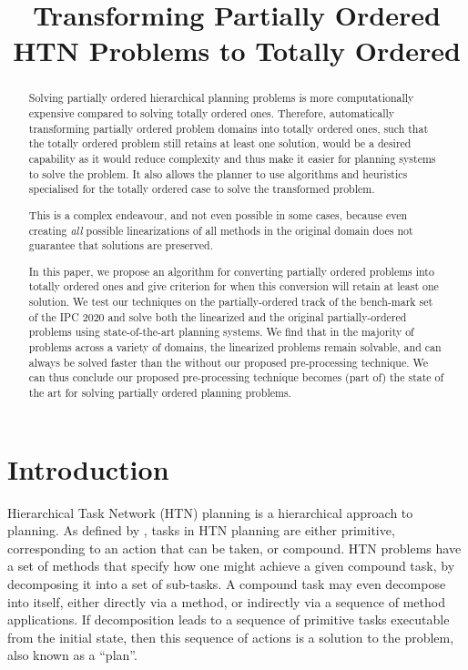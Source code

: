 \documentclass[letterpaper]{article}
\title{Transforming Partially Ordered HTN Problems to Totally Ordered}
\begin{document}
\maketitle

\begin{abstract}
Solving partially ordered hierarchical planning problems is more computationally expensive compared to solving totally ordered ones. Therefore, automatically transforming partially ordered problem domains into totally ordered ones, such that the totally ordered problem still retains at least one solution, would be a desired capability as it would reduce complexity and thus make it easier for planning systems to solve the problem. It also allows the planner to use algorithms and heuristics specialised for the totally ordered case to solve the transformed problem. 

This is a complex endeavour, and not even possible in some cases, because even creating \emph{all} possible linearizations of all methods in the original domain does not guarantee that solutions are preserved. 

In this paper, we propose an algorithm for converting partially ordered problems into totally ordered ones and give criterion for when this conversion will retain at least one solution. We test our techniques on the partially-ordered track of the bench-mark set of the IPC 2020 and solve both the linearized and the original partially-ordered problems using state-of-the-art planning systems. We find that in the majority of problems across a variety of domains, the linearized problems remain solvable, and can always be solved faster than the without our proposed pre-processing technique. We can thus conclude our proposed pre-processing technique becomes (part of)
the state of the art for solving partially ordered planning problems.
\end{abstract}

\section{Introduction}
 
Hierarchical Task Network (HTN) planning is a hierarchical approach to planning. As defined by \cite{HTNSurvey},  %
tasks in HTN planning are either primitive, corresponding to an action that can be taken, or compound. HTN problems have a set of methods that specify how one might achieve a given compound task, by decomposing it into a set of sub-tasks. A compound task may even decompose into itself, either directly via a method, or indirectly via a sequence of method applications. If decomposition leads to a sequence of primitive tasks executable from the initial state, then this sequence of actions is a solution to the problem, also known as a \enquote{plan}. 
 
\end{document}
